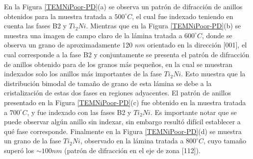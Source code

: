 \documentclass[12pt]{article}
\theoremstyle{definition}
\theoremstyle{remark}
\begin{document}
{En la Figura \ref{TEMNiPoor-PD}(a) se observa un patrón de difracción de anillos obtenidos para la muestra tratada a $500 ^\circ C$, el cual fue indexado teniendo en cuenta las fases B2 y $Ti_2Ni$. Mientras que en la Figura \ref{TEMNiPoor-PD}(b) se muestra una imagen de campo claro de la lámina tratada a $600 ^\circ C$, donde se observa un grano de aproximadamente 120 $nm$ orientado en la dirección [001], el cual corresponde a la fase B2 y conjuntamente se presenta el patrón de difracción de anillos obtenido para de los granos más pequeños, en la cual se muestran indexados solo los anillos más importantes de la fase $Ti_2 Ni$. Esto muestra que la distribución bimodal de tamaño de grano de esta lámina se debe a la cristalización de estas dos fases en regiones adyacentes. El patrón de anillos presentado en la Figura \ref{TEMNiPoor-PD}(c) fue obtenido en la muestra tratada a $700 ^\circ C$, y fue  indexado con las fases B2 y $Ti_2Ni$. Es importante notar que se puede observar algún anillo sin indexar, sin embargo resultó difícil establecer a qué fase corresponde. Finalmente en la Figura \ref{TEMNiPoor-PD}(d) se muestra un grano de la fase $Ti_2Ni$, observado en la lámina tratada a $800 ^\circ C$, cuyo tamaño superó los $\sim 100 nm$ (patrón de difracción en el eje de zona [112]).

}
\end{document}
